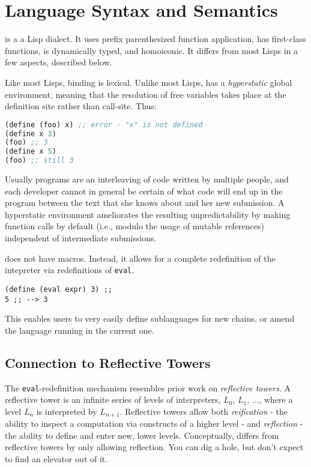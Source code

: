 \section{Language Syntax and Semantics}

\rad is a a Lisp dialect. It uses prefix parenthesized function application,
has first-class functions, is dynamically typed, and homoiconic. It differs
from most Lisps in a few aspects, described below.

Like most Lisps, binding is lexical. Unlike most Lisps, \rad has a
\textit{hyperstatic} global environment, meaning that the resolution of free
variables takes place at the definition site rather than call-site. Thus:

\begin{lstlisting}[language=Lisp, basicstyle=\small\ttfamily]
(define (foo) x) ;; error - "x" is not defined
(define x 3)
(foo) ;; 3
(define x 5)
(foo) ;; still 3
\end{lstlisting}

Usually \rad programs are an interleaving of code written by multiple people,
and each developer cannot in general be certain of what code will end up in the
program between the text that she knows about and her new submission. A
hyperstatic environment ameliorates the resulting unpredictability by making
function calls by default (i.e., modulo the usage of mutable references)
independent of intermediate submissions.

\rad does not have macros. Instead, it allows for a complete redefinition of
the intepreter via redefinitions of \texttt{eval}.

\begin{lstlisting}[basicstyle=\small\ttfamily]
(define (eval expr) 3) ;;
5 ;; --> 3
\end{lstlisting}

This enables users to very easily define sublanguages for new chains, or amend
the language running in the current one.

\subsection{Connection to Reflective Towers} The \texttt{eval}-redefinition
mechanism resembles prior work on \textit{reflective towers}. A reflective
tower is an infinite series of levels of interpreters, $L_0$, $L_1$, ..., where
a level $L_n$ is interpreted by $L_{n+1}$. Reflective towers allow both
\textit{reification} - the ability to inspect a computation via constructs of a
higher level - and \textit{reflection} - the ability to define and enter new,
lower levels. Conceptually, \rad differs from reflective towers by only
allowing reflection. You can dig a hole, but don't expect to find an elevator
out of it.


